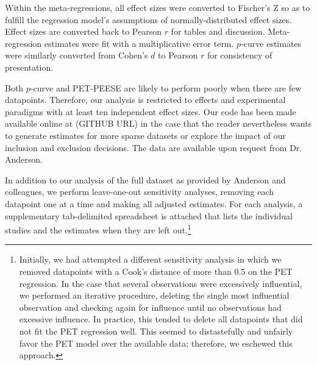 \documentclass[man]{apa6}
\begin{document}

Within the meta-regressions, all effect sizes were converted to Fischer's Z so as to fulfill the regression model's assumptions of normally-distributed effect sizes. Effect sizes are converted back to Pearson $r$ for tables and discussion. %
Meta-regression estimates were fit with a multiplicative error term.
$p$-curve estimates were similarly converted from Cohen's $d$ to Pearson $r$ for consistency of presentation.

Both $p$-curve and PET-PEESE are likely to perform poorly when there are few datapoints. Therefore, our analysis is restricted to effects and experimental paradigms with at least ten independent effect sizes. %
Our code has been made available online at (GITHUB URL) in the case that the reader nevertheless wants to generate estimates for more sparse datasets or explore the impact of our inclusion and exclusion decisions. The data are available upon request from Dr. Anderson. %

In addition to our analysis of the full dataset as provided by Anderson and colleagues, we perform leave-one-out sensitivity analyses, removing each datapoint one at a time and making all adjusted estimates. For each analysis, a supplementary tab-delimited spreadsheet is attached that lists the individual studies and the estimates when they are left out.\footnote{Initially, we had attempted a different sensitivity analysis in which we removed datapoints with a Cook's distance of more than 0.5 on the PET regression. In the case that several observations were excessively influential, we performed an iterative procedure, deleting the single most influential observation and checking again for influence until no observations had excessive influence. In practice, this tended to delete all datapoints that did not fit the PET regression well. This seemed to distastefully and unfairly favor the PET model over the available data; therefore, we eschewed this approach.}
\end{document}
